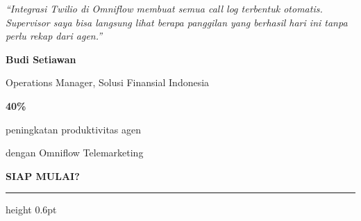 \documentclass[a4paper]{article}
\newcommand{\sectiontitle}[1]{%
    \vspace{10pt}%
    {\fontsize{13}{16}\selectfont\bfseries\color{BlueDark} #1}\par\vspace{3pt}%
    {\color{BluePrimary}\hrule height 0.6pt}\par\vspace{8pt}%
}
\begin{document}
\noindent
\begin{minipage}[t]{0.485\textwidth}
    \colorbox{BlueBg}{%
        \begin{minipage}{\dimexpr\linewidth-2\fboxsep\relax}
            {\fontsize{9.5}{13}\selectfont\color{TextDark}\textit{``Integrasi Twilio di Omniflow membuat semua call log terbentuk otomatis. Supervisor saya bisa langsung lihat berapa panggilan yang berhasil hari ini tanpa perlu rekap dari agen.''}}\par\vspace{4pt}
            {\fontsize{8.5}{11}\selectfont\bfseries\color{BluePrimary} Budi Setiawan}\par
            {\fontsize{8}{10}\selectfont\color{TextLight} Operations Manager, Solusi Finansial Indonesia}
        \end{minipage}}
\end{minipage}%
\hfill
\begin{minipage}[t]{0.485\textwidth}
    \colorbox{BlueBg}{%
        \begin{minipage}{\dimexpr\linewidth-2\fboxsep\relax}
            \begin{center}
                {\fontsize{20}{24}\selectfont\bfseries\color{CrimsonPrimary} 40\%}\par
                {\fontsize{9.5}{12}\selectfont\color{TextDark} peningkatan produktivitas agen}\par
                {\fontsize{9.5}{12}\selectfont\color{TextDark} dengan Omniflow Telemarketing}
            \end{center}
        \end{minipage}}
\end{minipage}

\sectiontitle{SIAP MULAI?}
\end{document}
